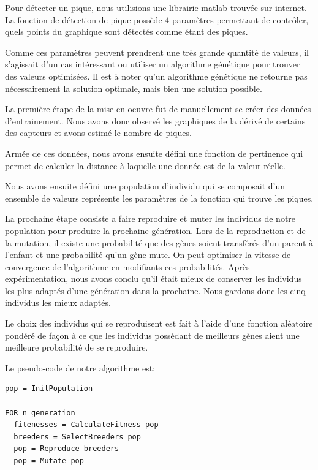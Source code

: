 \documentclass[12pt,letterpaper]{article}
\begin{document}
Pour détecter un pique, nous utilisions une librairie matlab trouvée sur internet. La fonction de détection de pique
possède 4 paramètres permettant de contrôler, quels points du graphique sont détectés comme étant des piques. 

Comme ces paramètres peuvent prendrent une très grande quantité de valeurs, il s'agissait d'un cas intéressant ou utiliser
un algorithme génétique pour trouver des valeurs optimisées. Il est à noter qu'un algorithme génétique ne retourne pas 
nécessairement la solution optimale, mais bien une solution possible. 

La première étape de la mise en oeuvre fut de manuellement se créer des données d'entrainement. Nous avons donc 
observé les graphiques de la dérivé de certains des capteurs et avons estimé le nombre de piques. 

Armée de ces données, nous avons ensuite défini une fonction de pertinence qui permet de calculer la distance à laquelle 
une donnée est de la valeur réelle. 

Nous avons ensuite défini une population d'individu qui se composait d'un ensemble de valeurs représente les paramètres de la
fonction qui trouve les piques. 

La prochaine étape consiste a faire reproduire et muter les individus de notre population pour produire la prochaine génération. 
Lors de la reproduction et de la mutation, il existe une probabilité que des gènes soient transférés d'un parent à l'enfant et une
probabilité qu'un gène mute. On peut optimiser la vitesse de convergence de l'algorithme en modifiants ces probabilités. Après 
expérimentation, nous avons conclu qu'il était mieux de conserver les individus les plus adaptés d'une génération dans la prochaine. 
Nous gardons donc les cinq individus les mieux adaptés. 

Le choix des individus qui se reproduisent est fait à l'aide d'une fonction aléatoire pondéré de façon à ce que les individus possédant
de meilleurs gènes aient une meilleure probabilité de se reproduire. 

Le pseudo-code de notre algorithme est:

\begin{verbatim}
pop = InitPopulation

FOR n generation
  fitenesses = CalculateFitness pop
  breeders = SelectBreeders pop
  pop = Reproduce breeders
  pop = Mutate pop

\end{verbatim}
\end{document}

